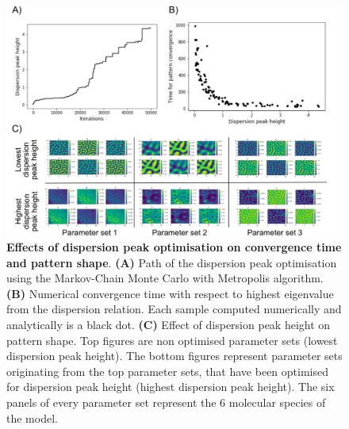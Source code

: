\begin{figure}[H] %
    \centering
    \includegraphics[width=1\textwidth]{chapters/Chapter 1/dispersion_peak_optimisation} %
    \caption{\textbf{Effects of dispersion peak optimisation on convergence time and pattern shape}. \textbf{(A)} Path of the dispersion peak optimisation using the Markov-Chain Monte Carlo with Metropolis algorithm. \textbf{(B)} Numerical convergence time with respect to highest eigenvalue from the dispersion relation. Each sample computed numerically and analytically is a black dot. \textbf{(C)} Effect of dispersion peak height on pattern shape. Top figures are non optimised parameter sets (lowest dispersion peak height). The bottom figures represent parameter sets originating from the top parameter sets, that have been optimised for dispersion peak height (highest dispersion peak height). The six panels of every parameter set represent the 6 molecular species of the model.}
    \label{fig:dispersion_peak_optimisation} %
\end{figure}



